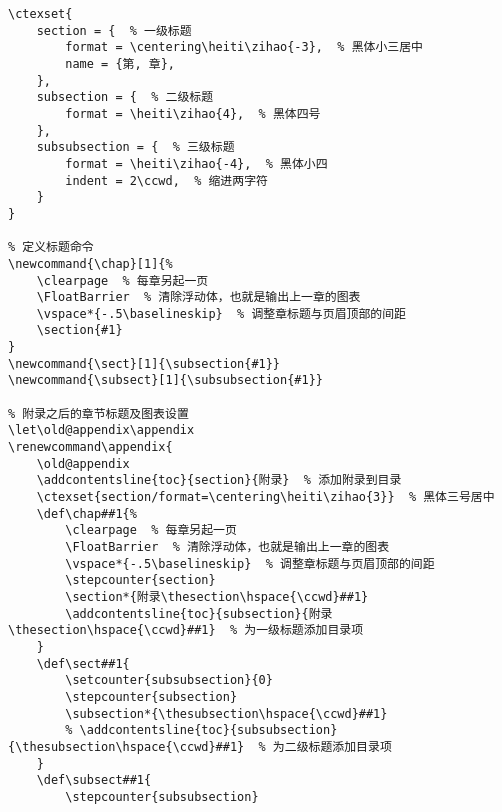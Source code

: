 \begin{lstlisting}[numbers=none,frame=none]
% 章节标题
\ctexset{
	section = {  % 一级标题
		format = \centering\heiti\zihao{-3},  % 黑体小三居中
		name = {第, 章},
	},
	subsection = {  % 二级标题
		format = \heiti\zihao{4},  % 黑体四号
	},
	subsubsection = {  % 三级标题
		format = \heiti\zihao{-4},  % 黑体小四
        indent = 2\ccwd,  % 缩进两字符
	}
}

% 定义标题命令
\newcommand{\chap}[1]{%
	\clearpage  % 每章另起一页
    \FloatBarrier  % 清除浮动体，也就是输出上一章的图表
    \vspace*{-.5\baselineskip}  % 调整章标题与页眉顶部的间距
	\section{#1}
}
\newcommand{\sect}[1]{\subsection{#1}}
\newcommand{\subsect}[1]{\subsubsection{#1}}

% 附录之后的章节标题及图表设置
\let\old@appendix\appendix
\renewcommand\appendix{
    \old@appendix
    \addcontentsline{toc}{section}{附录}  % 添加附录到目录
    \ctexset{section/format=\centering\heiti\zihao{3}}  % 黑体三号居中
    \def\chap##1{%
        \clearpage  % 每章另起一页
        \FloatBarrier  % 清除浮动体，也就是输出上一章的图表
        \vspace*{-.5\baselineskip}  % 调整章标题与页眉顶部的间距
        \stepcounter{section}
        \section*{附录\thesection\hspace{\ccwd}##1}
        \addcontentsline{toc}{subsection}{附录\thesection\hspace{\ccwd}##1}  % 为一级标题添加目录项
    }
    \def\sect##1{
        \setcounter{subsubsection}{0}
        \stepcounter{subsection}
        \subsection*{\thesubsection\hspace{\ccwd}##1}
        % \addcontentsline{toc}{subsubsection}{\thesubsection\hspace{\ccwd}##1}  % 为二级标题添加目录项
    }
    \def\subsect##1{
        \stepcounter{subsubsection}

\end{lstlisting}
